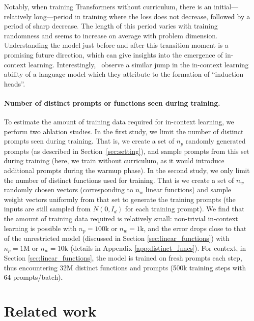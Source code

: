 \documentclass{article}
\begin{document}
Notably, when training Transformers without curriculum, there is an initial---relatively long---period  in training where the loss does not decrease, followed by a period of sharp decrease.
The length of this period varies with training randomness and seems to increase on average with problem dimension.
Understanding the model just before and after this transition moment is a promising future direction, which can give insights into the emergence of  in-context learning. 
Interestingly,~\citet{olsson2022context} observe a similar jump in the in-context learning ability of a language model which they attribute to the formation of ``induction heads''.

\paragraph{Number of distinct prompts or functions seen during training.} 
To estimate the amount of training data required for in-context learning, we perform two ablation studies. In the first study, we limit the number of distinct prompts seen during training. That is, we create a set of $n_p$ randomly generated prompts (as described in Section~\ref{sec:setting}), and sample prompts from this set during training (here, we train without curriculum, as it would introduce additional prompts during the warmup phase). In the second study, we only limit the number of distinct functions used for training.
That is we create a set of $n_w$ randomly chosen vectors (corresponding to $n_w$ linear functions) and sample weight vectors uniformly from that set to generate the training prompts (the inputs are still sampled from $N(0, I_d)$ for each training prompt).
We find that the amount of training data required is relatively small: non-trivial in-context learning is possible with $n_p = 100\text{k}$  or $n_w = 1\text{k}$, and the error drops close to that of the unrestricted model (discussed in Section \ref{sec:linear_functions}) with $n_p = 1\text{M}$ or $n_w = 10\text{k}$ (details in Appendix \ref{app:distinct_funcs}).
For context, in Section \ref{sec:linear_functions}, the model is trained on fresh prompts each step, thus encountering 32M distinct functions and prompts (500k training steps with 64 prompts/batch). 

\section{Related work}
\label{sec:related}
\end{document}
